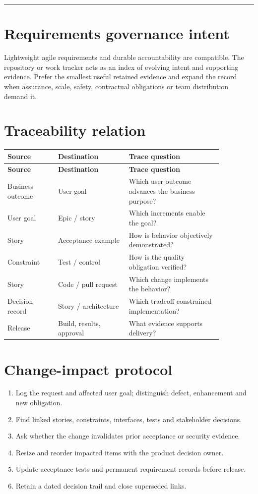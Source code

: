 \documentclass[11pt,letterpaper]{article}
\begin{document}
\tableofcontents\medskip\noindent\rule{\linewidth}{0.4pt}\medskip
\section{Requirements governance intent}
Lightweight agile requirements and durable accountability are compatible. The repository or work tracker acts as an index of evolving intent and supporting evidence. Prefer the smallest useful retained evidence and expand the record when assurance, scale, safety, contractual obligations or team distribution demand it.

\section{Traceability relation}
\begin{longtable}{|p{0.20\linewidth}|p{0.29\linewidth}|p{0.37\linewidth}|}\hline
\textbf{Source} & \textbf{Destination} & \textbf{Trace question} \\ \hline\endfirsthead\hline
\textbf{Source} & \textbf{Destination} & \textbf{Trace question} \\ \hline\endhead
Business outcome & User goal & Which user outcome advances the business purpose? \\ \hline
User goal & Epic / story & Which increments enable the goal? \\ \hline
Story & Acceptance example & How is behavior objectively demonstrated? \\ \hline
Constraint & Test / control & How is the quality obligation verified? \\ \hline
Story & Code / pull request & Which change implements the behavior? \\ \hline
Decision record & Story / architecture & Which tradeoff constrained implementation? \\ \hline
Release & Build, results, approval & What evidence supports delivery? \\ \hline
\end{longtable}
\section{Change-impact protocol}
\begin{enumerate}[leftmargin=*,itemsep=3pt]
\item Log the request and affected user goal; distinguish defect, enhancement and new obligation.
\item Find linked stories, constraints, interfaces, tests and stakeholder decisions.
\item Ask whether the change invalidates prior acceptance or security evidence.
\item Resize and reorder impacted items with the product decision owner.
\item Update acceptance tests and permanent requirement records before release.
\item Retain a dated decision trail and close superseded links.
\end{enumerate}
\end{document}
